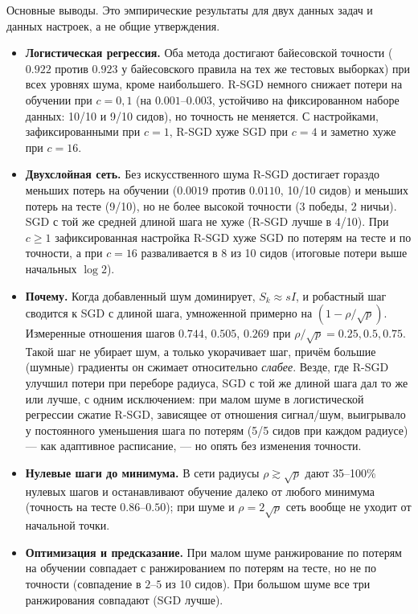 \documentclass[11pt,a4paper]{article}
\begin{document}
Основные выводы. Это эмпирические результаты для двух данных задач и данных настроек, а не
общие утверждения.
\begin{itemize}
\item \textbf{Логистическая регрессия.} Оба метода достигают байесовской точности ($0.922$
против $0.923$ у байесовского правила на тех же тестовых выборках) при всех уровнях шума,
кроме наибольшего. R-SGD немного снижает потери на обучении при $c=0,1$ (на
$0.001$--$0.003$, устойчиво на фиксированном наборе данных: 10/10 и 9/10 сидов), но
точность не меняется. С настройками, зафиксированными при $c=1$, R-SGD хуже SGD при $c=4$ и
заметно хуже при $c=16$.
\item \textbf{Двухслойная сеть.} Без искусственного шума R-SGD достигает гораздо меньших
потерь на обучении ($0.0019$ против $0.0110$, 10/10 сидов) и меньших потерь на тесте (9/10),
но не более высокой точности (3 победы, 2 ничьи). SGD с той же средней длиной шага не хуже
(R-SGD лучше в 4/10). При $c\ge1$ зафиксированная настройка R-SGD хуже SGD по потерям на тесте
и по точности, а при $c=16$ разваливается в 8 из 10 сидов (итоговые потери выше начальных
$\log2$).
\item \textbf{Почему.} Когда добавленный шум доминирует, $S_k\approx sI$, и робастный шаг
сводится к SGD с длиной шага, умноженной примерно на $(1-\rho/\sqrt p)$. Измеренные отношения
шагов $0.744$, $0.505$, $0.269$ при $\rho/\sqrt p=0.25,0.5,0.75$. Такой шаг не убирает шум, а
только укорачивает шаг, причём большие (шумные) градиенты он сжимает относительно
\emph{слабее}. Везде, где R-SGD улучшил потери при переборе радиуса, SGD с той же длиной шага
дал то же или лучше, с одним исключением: при малом шуме в логистической регрессии
сжатие R-SGD, зависящее от отношения сигнал/шум, выигрывало у постоянного уменьшения шага по
потерям (5/5 сидов при каждом радиусе) — как адаптивное расписание, — но опять без изменения
точности.
\item \textbf{Нулевые шаги до минимума.} В сети радиусы $\rho\gtrsim\sqrt p$ дают 35--100\%
нулевых шагов и останавливают обучение далеко от любого минимума (точность на тесте
$0.86$--$0.50$); при шуме и $\rho=2\sqrt p$ сеть вообще не уходит от начальной точки.
\item \textbf{Оптимизация и предсказание.} При малом шуме ранжирование по потерям на
обучении совпадает с ранжированием по потерям на тесте, но не по точности (совпадение в
$2$--$5$ из 10 сидов). При большом шуме все три ранжирования совпадают (SGD лучше).
\end{itemize}
\end{document}
